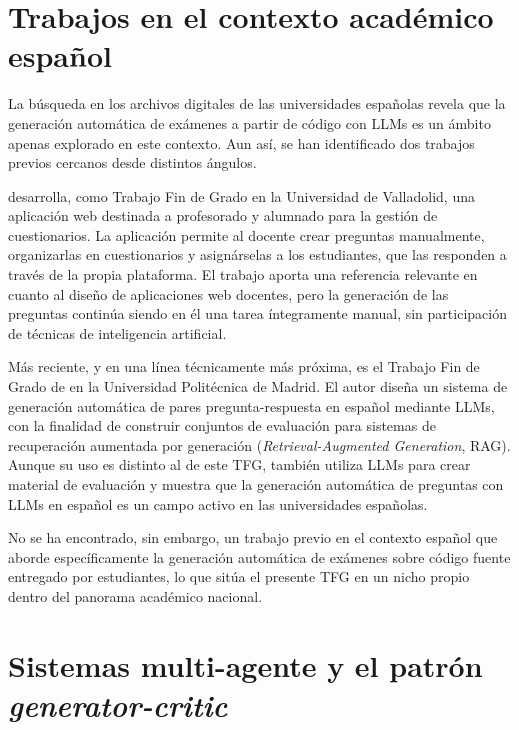 \section{Trabajos en el contexto académico español}
\label{sec:trabajos-espana}

La búsqueda en los archivos digitales de las universidades españolas
revela que la generación automática de exámenes a partir de código con
LLMs es un ámbito apenas explorado en este contexto. Aun así, se han
identificado dos trabajos previos cercanos desde distintos ángulos.

\textcite{briongos2020cuestionarios} desarrolla, como Trabajo Fin de
Grado en la Universidad de Valladolid, una aplicación web destinada a
profesorado y alumnado para la gestión de cuestionarios. La aplicación
permite al docente crear preguntas manualmente, organizarlas en
cuestionarios y asignárselas a los estudiantes, que las responden a
través de la propia plataforma. El trabajo aporta una referencia
relevante en cuanto al diseño de aplicaciones web docentes, pero la
generación de las preguntas continúa siendo en él una tarea íntegramente
manual, sin participación de técnicas de inteligencia artificial.

Más reciente, y en una línea técnicamente más próxima, es el Trabajo
Fin de Grado de \textcite{garcia2025ragqa} en la Universidad
Politécnica de Madrid. El autor diseña un sistema de generación
automática de pares pregunta-respuesta en español mediante LLMs, con la
finalidad de construir conjuntos de evaluación para sistemas de
recuperación aumentada por generación (\emph{Retrieval-Augmented
Generation}, RAG). Aunque su uso es distinto al de este TFG, también utiliza LLMs para
crear material de evaluación y muestra que la generación automática de
preguntas con LLMs en español es un campo activo en las universidades
españolas.

No se ha encontrado, sin embargo, un trabajo previo en el contexto
español que aborde específicamente la generación automática de
exámenes sobre código fuente entregado por estudiantes, lo que sitúa el
presente TFG en un nicho propio dentro del panorama académico nacional.


\section{Sistemas multi-agente y el patrón \emph{generator-critic}}
\label{sec:multiagente}

